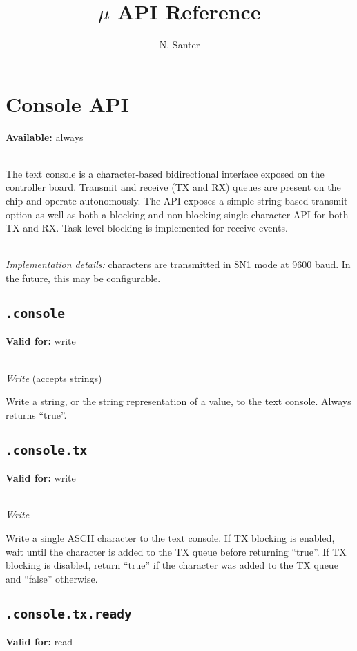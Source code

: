 \documentclass{article}
\title{$\mu$ API Reference}
\author{N. Santer}
\begin{document}
\maketitle

\tableofcontents

\clearpage

\section{Console API}
\textbf{Available:} always

~\\
The text console is a character-based bidirectional interface exposed on the controller board. Transmit and receive (TX and RX) queues are present on the chip and operate autonomously.
The API exposes a simple string-based transmit option as well as both a blocking and non-blocking single-character API for both TX and RX. Task-level blocking is implemented for receive events.

~\\
\textit{Implementation details:} characters are transmitted in 8N1 mode at 9600 baud. In the future, this may be configurable.

\subsection{\texttt{.console}}
\textbf{Valid for:} write

~\\
\textit{Write} (accepts strings)

Write a string, or the string representation of a value, to the text console. Always returns ``true''.

\subsection{\texttt{.console.tx}}
\textbf{Valid for:} write

~\\
\textit{Write}

Write a single ASCII character to the text console. If TX blocking is enabled, wait until the character is added to the TX queue before returning ``true''.
If TX blocking is disabled, return ``true'' if the character was added to the TX queue and ``false'' otherwise.

\subsection{\texttt{.console.tx.ready}}
\textbf{Valid for:} read
\end{document}
